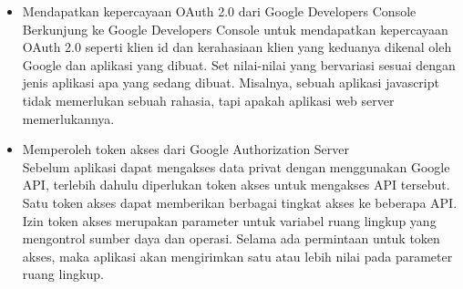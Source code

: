 \begin{itemize}
\item
Mendapatkan kepercayaan OAuth 2.0 dari Google Developers Console\\
Berkunjung ke Google Developers Console untuk mendapatkan kepercayaan OAuth 2.0 seperti klien id dan kerahasiaan klien yang keduanya dikenal oleh Google dan aplikasi yang dibuat. Set nilai-nilai yang bervariasi sesuai dengan jenis aplikasi apa yang sedang dibuat. Misalnya, sebuah aplikasi javascript tidak memerlukan sebuah rahasia, tapi apakah aplikasi web server memerlukannya.
\item
Memperoleh token akses dari Google Authorization Server\\
Sebelum aplikasi dapat mengakses data privat dengan menggunakan Google API, terlebih dahulu diperlukan token akses untuk mengakses API tersebut. Satu token akses dapat memberikan berbagai tingkat akses ke beberapa API. Izin token akses merupakan parameter untuk variabel ruang lingkup yang mengontrol sumber daya dan operasi. Selama ada permintaan untuk token akses, maka aplikasi akan mengirimkan satu atau lebih nilai pada parameter ruang lingkup.


\end{itemize}
